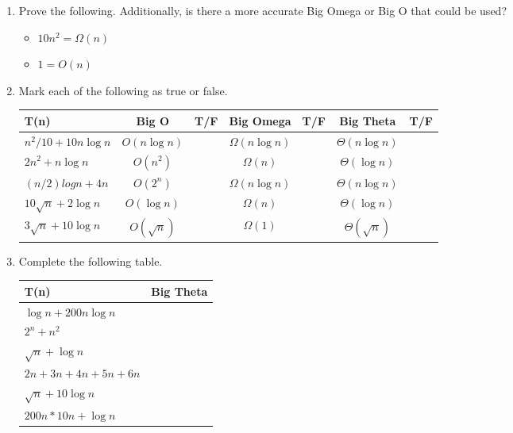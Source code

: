 \documentclass[11pt]{article}
\begin{document}
\begin{enumerate}[leftmargin=*]

\item Prove the following. Additionally, is there a more accurate Big Omega or Big O that could be used?
\begin{itemize}
    \item $10n^2 = \Omega(n)$
    \item $1 = O(n)$
\end{itemize}

\item Mark each of the following as true or false.
    \begin{center}
        \begin{tabular}{l | c | c | c | c | c | c}
            T(n) & Big O & T/F & Big Omega & T/F & Big Theta & T/F \\ \hline
            $ n^2/10 + 10 n \log n$ & $O(n \log n)$ & & $\Omega(n \log n)$ & & $\Theta(n \log n)$ & \\ \hline
            $ 2n^2 + n \log n$ & $O(n^2)$ & & $\Omega(n)$ & & $\Theta(\log n)$ & \\ \hline
            $(n/2) log n + 4n$ & $O(2^n)$ & & $\Omega(n \log n)$ & & $\Theta(n \log n)$ & \\ \hline
            $10 \sqrt{n} + 2\log n$ & $O(\log n)$ & & $\Omega(n)$ & & $\Theta(\log n)$ & \\ \hline
            $3\sqrt{n} + 10 \log n$ & $O(\sqrt n)$ & & $\Omega(1)$ & & $\Theta(\sqrt n)$ & \\ \hline
        \end{tabular}
    \end{center}
    \item Complete the following table.
    \begin{center}
        \begin{tabular}{l | c }
            T(n) & Big Theta \\ \hline
            $\log n + 200 n \log n$ & \\ \hline
            $2^n + n^2$ & \\ \hline
            $\sqrt n + \log n$ & \\ \hline
            $2n + 3n + 4n + 5n + 6n$ & \\ \hline
            $\sqrt{n} + 10 \log n$ & \\ \hline
            $200 n * 10 n + \log n$ & \\ \hline
        \end{tabular}
    \end{center}
    

\end{enumerate}
\end{document}
